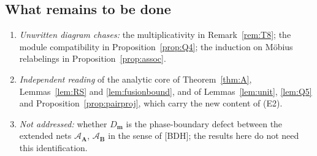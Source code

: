 \documentclass[11pt]{article}
\theoremstyle{definition}
\theoremstyle{remark}
\newcommand{\cA}{\mathcal A}
\newcommand{\bfB}{\mathbf B}
\newcommand{\bfA}{\mathbf A}
\begin{document}
\subsection{What remains to be done}
\begin{enumerate}[nosep,label=(\alph*)]
\item \emph{Unwritten diagram chases:} the multiplicativity in Remark~\ref{rem:T8}; the module compatibility in Proposition~\ref{prop:Q4}; the induction on M\"obius relabelings in Proposition~\ref{prop:assoc}.
\item \emph{Independent reading} of the analytic core of Theorem~\ref{thm:A}, Lemmas~\ref{lem:RS} and \ref{lem:fusionbound}, and of Lemmas~\ref{lem:unit}, \ref{lem:Q5} and Proposition~\ref{prop:pairproj}, which carry the new content of (E2).
\item \emph{Not addressed:} whether $D_{\mathbf m}$ is the phase-boundary defect between the extended nets $\cA_{\bfA}$, $\cA_{\bfB}$ in the sense of [BDH]; the results here do not need this identification.
\end{enumerate}


\appendix
\end{document}
